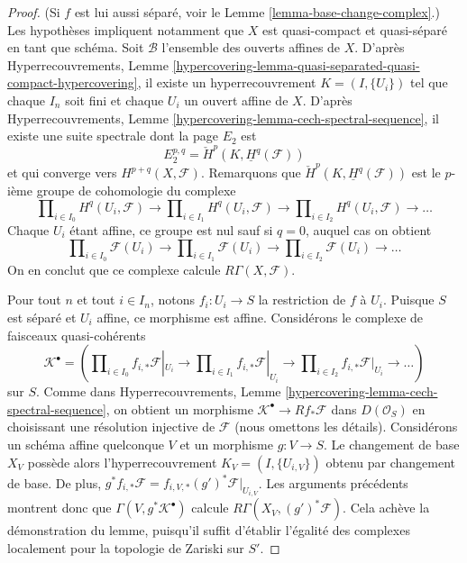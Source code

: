 \begin{proof}
(Si $f$ est lui aussi séparé, voir le Lemme
\ref{lemma-base-change-complex}.) Les hypothèses impliquent notamment que $X$
est quasi-compact et quasi-séparé en tant que schéma. Soit $\mathcal{B}$
l'ensemble des ouverts affines de $X$. D'après Hyperrecouvrements, Lemme
\ref{hypercovering-lemma-quasi-separated-quasi-compact-hypercovering}, il
existe un hyperrecouvrement $K = (I, \{U_i\})$ tel que chaque $I_n$ soit fini
et chaque $U_i$ un ouvert affine de $X$. D'après Hyperrecouvrements, Lemme
\ref{hypercovering-lemma-cech-spectral-sequence}, il existe une suite spectrale
dont la page $E_2$ est
$$
E_2^{p, q} = \check{H}^p(K, \underline{H}^q(\mathcal{F}))
$$
et qui converge vers $H^{p + q}(X, \mathcal{F})$. Remarquons que
$\check{H}^p(K, \underline{H}^q(\mathcal{F}))$ est le $p$-ième groupe de
cohomologie du complexe
$$
\prod\nolimits_{i \in I_0} H^q(U_i, \mathcal{F})
\to
\prod\nolimits_{i \in I_1} H^q(U_i, \mathcal{F})
\to
\prod\nolimits_{i \in I_2} H^q(U_i, \mathcal{F})
\to \ldots
$$
Chaque $U_i$ étant affine, ce groupe est nul sauf si $q = 0$, auquel cas on
obtient
$$
\prod\nolimits_{i \in I_0} \mathcal{F}(U_i)
\to
\prod\nolimits_{i \in I_1} \mathcal{F}(U_i)
\to
\prod\nolimits_{i \in I_2} \mathcal{F}(U_i)
\to \ldots
$$
On en conclut que ce complexe calcule $R\Gamma(X, \mathcal{F})$.

\medskip\noindent
Pour tout $n$ et tout $i \in I_n$, notons $f_i : U_i \to S$ la restriction de
$f$ à $U_i$. Puisque $S$ est séparé et $U_i$ affine, ce morphisme est affine.
Considérons le complexe de faisceaux quasi-cohérents
$$
\mathcal{K}^\bullet = (
\prod\nolimits_{i \in I_0} f_{i, *}\mathcal{F}|_{U_i}
\to
\prod\nolimits_{i \in I_1} f_{i, *}\mathcal{F}|_{U_i}
\to
\prod\nolimits_{i \in I_2} f_{i, *}\mathcal{F}|_{U_i}
\to \ldots )
$$
sur $S$. Comme dans Hyperrecouvrements, Lemme
\ref{hypercovering-lemma-cech-spectral-sequence}, on obtient un morphisme
$\mathcal{K}^\bullet \to Rf_*\mathcal{F}$ dans $D(\mathcal{O}_S)$ en
choisissant une résolution injective de $\mathcal{F}$ (nous omettons les
détails). Considérons un schéma affine quelconque $V$ et un
morphisme $g : V \to S$. Le changement de base $X_V$ possède alors
l'hyperrecouvrement $K_V = (I, \{U_{i, V}\})$ obtenu par changement de base.
De plus,
$g^*f_{i, *}\mathcal{F} = f_{i, V, *}(g')^*\mathcal{F}|_{U_{i, V}}$.
Les arguments précédents montrent donc que
$\Gamma(V, g^*\mathcal{K}^\bullet)$ calcule
$R\Gamma(X_V, (g')^*\mathcal{F})$. Cela achève la démonstration du lemme,
puisqu'il suffit d'établir l'égalité des complexes localement pour la topologie
de Zariski sur $S'$.
\end{proof}

